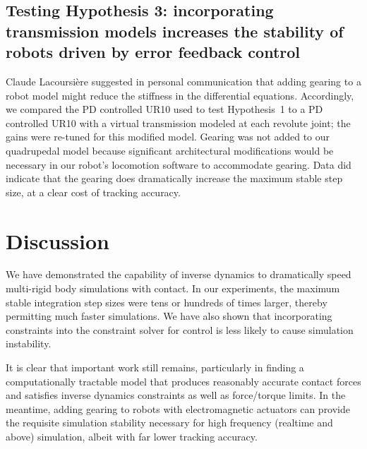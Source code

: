 \documentclass[conference]{IEEEtran}
\begin{document}
\subsection{Testing Hypothesis 3: incorporating transmission models increases the stability of robots driven by error feedback control}
Claude Lacoursi\`{e}re suggested in personal communication that adding gearing to a robot model might reduce the stiffness in the differential equations. Accordingly, we compared the PD controlled UR10 used to test Hypothesis~1 to a PD controlled UR10 with a virtual transmission modeled at each revolute joint; the gains were re-tuned for this modified model.  Gearing was not added to our quadrupedal model because significant architectural modifications would be necessary in our robot's locomotion software to accommodate gearing. Data did indicate that the gearing does dramatically increase the maximum stable step size, at a clear cost of tracking accuracy.

\section{Discussion}

We have demonstrated the capability of inverse dynamics to dramatically speed multi-rigid body simulations with contact.  In our experiments, the maximum stable integration step sizes were tens or hundreds of times larger, thereby permitting much faster simulations.  We have also shown that incorporating constraints into the constraint solver for control is less likely to cause simulation instability. %

It is clear that important work still remains, particularly in finding a computationally tractable model that produces reasonably accurate contact forces and satisfies inverse dynamics constraints as well as force/torque limits. In the meantime, adding gearing to robots with electromagnetic actuators can provide the requisite simulation stability necessary for high frequency (realtime and above) simulation, albeit with far lower tracking accuracy.


\end{document}
